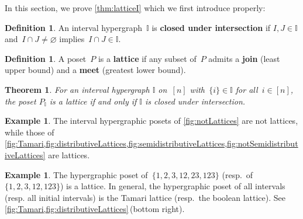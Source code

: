 \documentclass{amsart}
\newtheorem{theoremA}{Theorem}
\theoremstyle{definition}
\newtheorem{definition}[theorem]{Definition}
\newtheorem{example}[theorem]{Example}
\newcommand{\defn}[1]{\textbf{\textsf{\color{PineGreen} #1}}} %
\newcommand{\II}{\mathbb I} %
\begin{document}
In this section, we prove \cref{thm:latticeI} which we first introduce properly: %

\begin{definition}
\label{def:intersectionClosed}
An interval hypergraph~$\II$ is \defn{closed under intersection} if $I, J \in \II$ and~$I \cap J \ne \varnothing$ implies~$I \cap J \in \II$.
\end{definition}

\begin{definition}
A poset~$P$ is a \defn{lattice} if any subset of~$P$ admits a \defn{join} (least upper bound) and a \defn{meet} (greatest lower bound).
\end{definition}

\begin{theoremA}
For an interval hypergraph $\II$ on~$[n]$ with~$\{i\} \in \II$ for all~$i \in [n]$, the poset $P_\II$ is a lattice if and only if $\II$ is closed under intersection.
\end{theoremA}

\begin{example}
The interval hypergraphic posets of \cref{fig:notLattices} are not lattices, while those of \cref{fig:Tamari,fig:distributiveLattices,fig:semidistributiveLattices,fig:notSemidistributiveLattices} are lattices.
\end{example}

\begin{example}
The hypergraphic poset of~$\{ 1, 2, 3, 12, 23, 123\}$ (resp.~of~$\{ 1, 2, 3, 12, 123\}$) is a lattice.
In general, the hypergraphic poset of all intervals (resp. all initial intervals) is the Tamari lattice (resp.~the boolean lattice).
See \cref{fig:Tamari,fig:distributiveLattices}\,(bottom right).
\end{example}
\end{document}

